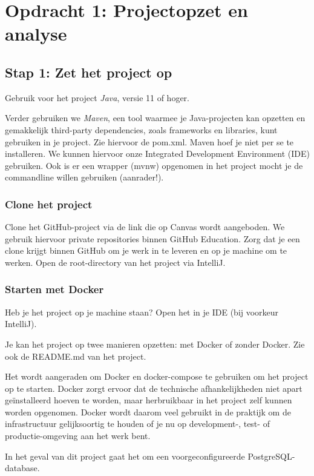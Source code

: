 \chapter{Opdracht 1: Projectopzet en analyse}

\section{Stap 1: Zet het project op}
Gebruik voor het project \textit{Java}, versie 11 of hoger.

Verder gebruiken we \textit{Maven}, een tool waarmee je Java-projecten kan opzetten
en gemakkelijk third-party dependencies, zoals frameworks en libraries, kunt 
gebruiken in je project. Zie hiervoor de pom.xml. Maven hoef je niet per se te 
installeren. We kunnen hiervoor onze Integrated Development Environment (IDE) gebruiken.
Ook is er een wrapper (mvnw) opgenomen in het project mocht je de commandline willen gebruiken (aanrader!). 

\subsection{Clone het project}
Clone het GitHub-project via de link die op Canvas wordt aangeboden.
We gebruik hiervoor private repositories binnen GitHub Education.
Zorg dat je een clone krijgt binnen GitHub om je werk in te leveren 
en op je machine om te werken. Open de root-directory van het project
via IntelliJ.

\subsection{Starten met Docker}
Heb je het project op je machine staan? Open het in je IDE (bij voorkeur IntelliJ).

Je kan het project op twee manieren opzetten: met Docker of zonder Docker. 
Zie ook de README.md van het project. 

Het wordt aangeraden om Docker en docker-compose te gebruiken om het project op te starten.
Docker zorgt ervoor dat de technische afhankelijkheden niet apart geïnstalleerd hoeven te worden,
maar herbruikbaar in het project zelf kunnen worden opgenomen.
Docker wordt daarom veel gebruikt in de praktijk om de infrastructuur gelijksoortig te houden 
of je nu op development-, test- of productie-omgeving aan het werk bent.

In het geval van dit project gaat het om een voorgeconfigureerde PostgreSQL-database.

